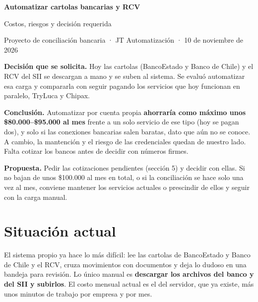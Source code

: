 \documentclass[11pt,a4paper]{article}
\begin{document}
\begin{center}
{\sffamily\LARGE\bfseries\color{oscuro} Automatizar cartolas bancarias y RCV\par}
\vspace{0.3em}
{\sffamily\large\color{gris} Costos, riesgos y decisión requerida\par}
\vspace{0.6em}
{\sffamily\small\color{gris} Proyecto de conciliación bancaria · JT Automatización · 10 de noviembre de 2026\par}
\end{center}
\vspace{0.4em}

\begin{resumen}
\textbf{Decisión que se solicita.} Hoy las cartolas (BancoEstado y Banco de Chile) y el RCV del SII se descargan a mano y se suben al sistema. Se evaluó automatizar esa carga y compararla con seguir pagando los servicios que hoy funcionan en paralelo, TryLuca y Chipax.

\textbf{Conclusión.} Automatizar por cuenta propia \textbf{ahorraría como máximo unos \$80.000--\$95.000 al mes} frente a un solo servicio de ese tipo (hoy se pagan dos), y solo si las conexiones bancarias salen baratas, dato que aún no se conoce. A cambio, la mantención y el riesgo de las credenciales quedan de nuestro lado. Falta cotizar los bancos antes de decidir con números firmes.

\textbf{Propuesta.} Pedir las cotizaciones pendientes (sección 5) y decidir con ellas. Si no bajan de unos \$100.000 al mes en total, o si la conciliación se hace solo una vez al mes, conviene mantener los servicios actuales o prescindir de ellos y seguir con la carga manual.
\end{resumen}

\section{Situación actual}

El sistema propio ya hace lo más difícil: lee las cartolas de BancoEstado y Banco de Chile y el RCV, cruza movimientos con documentos y deja lo dudoso en una bandeja para revisión. Lo único manual es \textbf{descargar los archivos del banco y del SII y subirlos}. El costo mensual actual es el del servidor, que ya existe, más unos minutos de trabajo por empresa y por mes.
\end{document}
